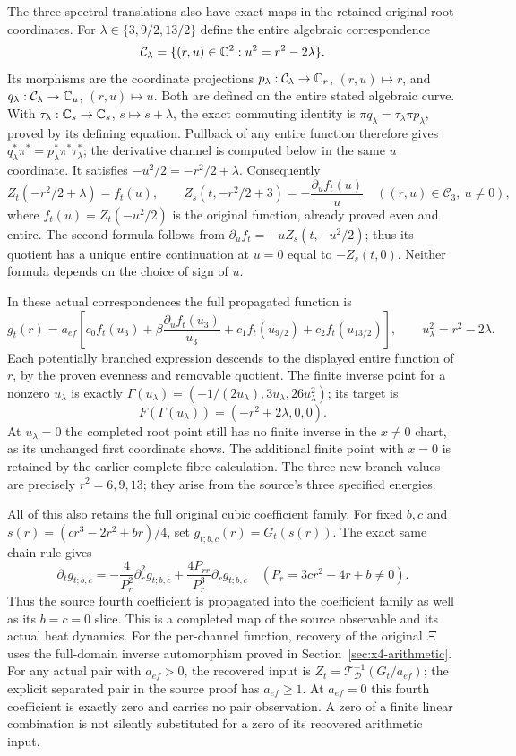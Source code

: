 The three spectral translations also have exact maps in the retained
original root coordinates. For
$\lambda\in\{3,9/2,13/2\}$ define the entire algebraic correspondence
\[
\mathcal C_\lambda=\{(r,u)\in\mathbb C^2:u^2=r^2-2\lambda\}.
\]
Its morphisms are the coordinate projections
$p_\lambda:\mathcal C_\lambda\to\mathbb C_r$, $(r,u)\mapsto r$, and
$q_\lambda:\mathcal C_\lambda\to\mathbb C_u$, $(r,u)\mapsto u$.
Both are defined on the entire stated algebraic curve. With
$\tau_\lambda:\mathbb C_s\to\mathbb C_s$, $s\mapsto s+\lambda$, the exact
commuting identity is
$\pi q_\lambda=\tau_\lambda\pi p_\lambda$, proved by its defining
equation. Pullback of any entire function therefore gives
$q_\lambda^*\pi^*=p_\lambda^*\pi^*\tau_\lambda^*$; the derivative
channel is computed below in the same $u$ coordinate.
It satisfies $-u^2/2=-r^2/2+\lambda$. Consequently
\[
Z_t(-r^2/2+\lambda)=f_t(u),\qquad
Z_s(t,-r^2/2+3)=-\frac{\partial_uf_t(u)}u
                 \quad ((r,u)\in\mathcal C_3,\ u\ne0),
\]
where $f_t(u)=Z_t(-u^2/2)$ is the original function, already proved
even and entire. The second formula follows from
$\partial_uf_t=-uZ_s(t,-u^2/2)$; thus its quotient has a unique
entire continuation at $u=0$ equal to $-Z_s(t,0)$. Neither formula
depends on the choice of sign of $u$.

In these actual correspondences the full propagated function is
\[
g_t(r)=a_{ef}\left[c_0f_t(u_3)+
 \beta\frac{\partial_uf_t(u_3)}{u_3}
 +c_1f_t(u_{9/2})+c_2f_t(u_{13/2})\right],\qquad
u_\lambda^2=r^2-2\lambda.
\]
Each potentially branched expression descends to the displayed entire
function of $r$, by the proven evenness and removable quotient. The
finite inverse point for a nonzero $u_\lambda$ is exactly
$\Gamma(u_\lambda)=(-1/(2u_\lambda),3u_\lambda,26u_\lambda^2)$;
its target is
\[
F(\Gamma(u_\lambda))=(-r^2+2\lambda,0,0).
\]
At $u_\lambda=0$ the completed root point still has no finite inverse
in the $x\ne0$ chart, as its unchanged first coordinate shows. The
additional finite point with $x=0$ is retained by the earlier complete
fibre calculation. The three new branch values are precisely
$r^2=6,9,13$; they arise from the source's three specified energies.

All of this also retains the full original cubic coefficient family.
For fixed $b,c$ and $s(r)=(cr^3-2r^2+br)/4$, set
$g_{t;b,c}(r)=G_t(s(r))$. The exact same chain rule gives
\[
\partial_tg_{t;b,c}=
 -\frac4{P_r^2}\partial_r^2g_{t;b,c}
 +\frac{4P_{rr}}{P_r^3}\partial_rg_{t;b,c}
 \quad(P_r=3cr^2-4r+b\ne0).
\]
Thus the source fourth coefficient is propagated into the coefficient
family as well as its $b=c=0$ slice. This is a completed map of the
source observable and its actual heat dynamics. For the per-channel
function, recovery of the original $\Xi$ uses the full-domain inverse
automorphism proved in Section~\ref{sec:x4-arithmetic}. For any actual
pair with $a_{ef}>0$, the recovered input is
$Z_t=\mathcal T_{\mathcal D}^{-1}(G_t/a_{ef})$; the explicit separated
pair in the source proof has $a_{ef}\ge1$. At $a_{ef}=0$ this fourth
coefficient is exactly zero and carries no pair observation. A zero of a finite linear
combination is not silently substituted for a zero of its recovered
arithmetic input.
